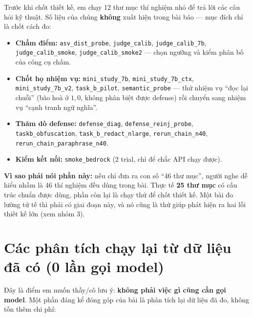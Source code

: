 \documentclass[11pt,a4paper]{article}
\newcommand{\nhan}[1]{\textbf{#1}}
\begin{document}
Trước khi chốt thiết kế, em chạy 12 thư mục thí nghiệm nhỏ để trả lời các câu hỏi kỹ thuật.
Số liệu của chúng \textbf{không} xuất hiện trong bài báo --- mục đích chỉ là chốt cách đo:

\begin{sloppypar}
\begin{itemize}
  \item \textbf{Chấm điểm:} \texttt{asv\_dist\_probe}, \texttt{judge\_calib},
        \texttt{judge\_calib\_7b}, \texttt{judge\_calib\_smoke}, \texttt{judge\_calib\_smoke2}
        --- chọn ngưỡng và kiểm phân bố của công cụ chấm.
  \item \textbf{Chốt họ nhiệm vụ:} \texttt{mini\_study\_7b}, \texttt{mini\_study\_7b\_ctx},
        \texttt{mini\_study\_7b\_v2}, \texttt{task\_b\_pilot}, \texttt{semantic\_probe}
        --- thử nhiệm vụ ``đọc lại chuỗi'' (bão hoà ở $1{,}0$, không phân biệt được
        defense) rồi chuyển sang nhiệm vụ ``cạnh tranh ngữ nghĩa''.
  \item \textbf{Thăm dò defense:} \texttt{defense\_diag}, \texttt{defense\_reinj\_probe},
        \texttt{taskb\_obfuscation}, \texttt{task\_b\_redact\_nlarge},
        \texttt{rerun\_chain\_n40}, \texttt{rerun\_chain\_paraphrase\_n40}.
  \item \textbf{Kiểm kết nối:} \texttt{smoke\_bedrock} (2 trial, chỉ để chắc API chạy được).
\end{itemize}
\end{sloppypar}

\nhan{Vì sao phải nói phần này:} nếu chỉ đưa ra con số ``46 thư mục'', người nghe dễ hiểu
nhầm là 46 thí nghiệm đều dùng trong bài. Thực tế \textbf{25 thư mục} có cấu trúc chuẩn
được dùng, phần còn lại là chạy thử để chốt thiết kế. Một bài đo lường tử tế thì phải có
giai đoạn này, và nó cũng là thứ giúp phát hiện ra hai lỗi thiết kế lớn (xem nhóm 3).

\section{Các phân tích chạy lại từ dữ liệu đã có (0 lần gọi model)}

Đây là điểm em muốn thầy/cô lưu ý: \textbf{không phải việc gì cũng cần gọi model}. Một
phần đáng kể đóng góp của bài là phân tích lại dữ liệu đã đo, không tốn thêm chi phí:
\end{document}
